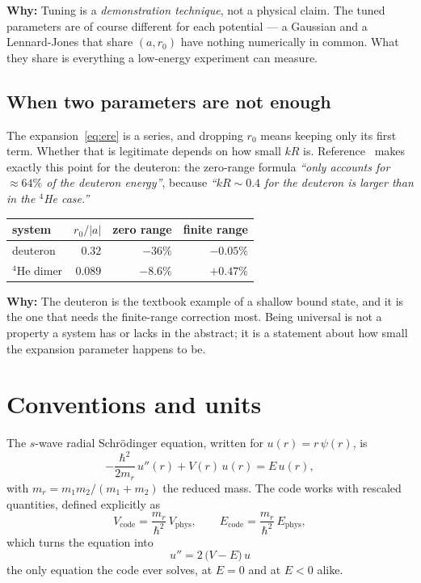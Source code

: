 \documentclass[11pt,a4paper]{article}
\newcommand{\why}[1]{\medskip\noindent\textbf{Why:} #1\medskip}
\begin{document}
\why{Tuning is a \emph{demonstration technique}, not a physical claim. The tuned
parameters are of course different for each potential --- a Gaussian and a
Lennard-Jones that share $(a, r_0)$ have nothing numerically in common. What
they share is everything a low-energy experiment can measure.}

\subsection*{When two parameters are not enough}

The expansion~\eqref{eq:ere} is a series, and dropping $r_0$ means keeping only
its first term. Whether that is legitimate depends on how small $kR$ is.
Reference~\cite{rbef} makes exactly this point for the deuteron: the zero-range
formula \emph{``only accounts for $\approx 64\%$ of the deuteron energy''},
because \emph{``$kR \sim 0.4$ for the deuteron is larger than in the $^4$He
case.''}

\begin{center}
\begin{tabular}{lrrr}
\toprule
system & $r_0/|a|$ & zero range & finite range \\
\midrule
deuteron & $0.32$ & $-36\%$ & $-0.05\%$ \\
$^4$He dimer & $0.089$ & $-8.6\%$ & $+0.47\%$ \\
\bottomrule
\end{tabular}
\end{center}

\why{The deuteron is the textbook example of a shallow bound state, and it is
the one that needs the finite-range correction most. Being universal is not a
property a system has or lacks in the abstract; it is a statement about how
small the expansion parameter happens to be.}

\section{Conventions and units}
\label{sec:conv}

The $s$-wave radial Schrödinger equation, written for $u(r) = r\,\psi(r)$, is
\begin{equation}
  -\frac{\hbar^2}{2m_r}\,u''(r) + V(r)\,u(r) = E\,u(r),
\end{equation}
with $m_r = m_1m_2/(m_1+m_2)$ the reduced mass. The code works with rescaled
quantities, defined explicitly as
\begin{equation}
  V_{\mathrm{code}} = \frac{m_r}{\hbar^2}\,V_{\mathrm{phys}},
  \qquad
  E_{\mathrm{code}} = \frac{m_r}{\hbar^2}\,E_{\mathrm{phys}},
  \label{eq:codeunits}
\end{equation}
which turns the equation into
\begin{equation}
  \boxed{\;u'' = 2\,\bigl(V - E\bigr)\,u\;}
  \label{eq:radial}
\end{equation}
the only equation the code ever solves, at $E = 0$ and at $E < 0$ alike.
\end{document}
